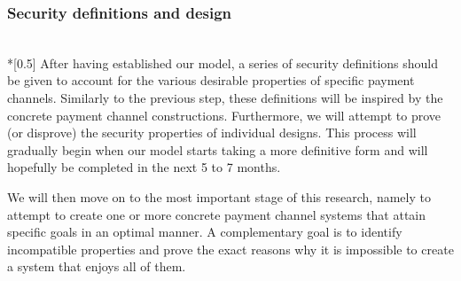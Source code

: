 \subsubsection{Security definitions and design} \ \\*[0.5\baselineskip]
  After having established our model, a series of security definitions should be given to
  account for the various desirable properties of specific payment channels. Similarly to
  the previous step, these definitions will be inspired by the concrete payment channel
  constructions. Furthermore, we will attempt to prove (or disprove) the security
  properties of individual designs. This process will gradually begin when our model
  starts taking a more definitive form and will hopefully be completed in the next 5 to 7
  months.

  We will then move on to the most important stage of this research, namely to attempt to
  create one or more concrete payment channel systems that attain specific goals in an
  optimal manner. A complementary goal is to identify incompatible properties and prove
  the exact reasons why it is impossible to create a system that enjoys all of them.

